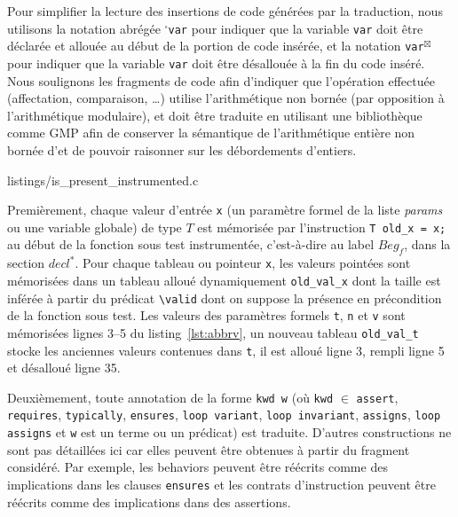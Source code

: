 Pour simplifier la lecture des insertions de code générées par la traduction,
nous utilisons la notation abrégée ${}^{\square}$\lstinline{var} pour indiquer
que la variable \lstinline{var} doit être déclarée et allouée 
au début de la portion de code insérée, et la notation
\lstinline{var}${}^{\boxtimes}$ pour indiquer que la variable \lstinline{var} doit
être désallouée
à la fin du code inséré.
Nous soulignons les fragments de code afin d'indiquer que l'opération effectuée
(affectation, comparaison, \dots) utilise l'arithmétique non bornée (par
opposition à l'arithmétique modulaire), et doit être traduite en utilisant une
bibliothèque comme GMP afin de conserver la sémantique de l'arithmétique entière
non bornée d'\eacsl et de pouvoir raisonner sur les débordements d'entiers.



                {listings/is_present_instrumented.c}


Premièrement, chaque valeur d'entrée \lstinline'x' (un paramètre formel de la
liste \textit{params} ou une variable globale) de type $T$ est mémorisée par
l'instruction \lstinline|T old_x = x;| au début de la fonction sous test
instrumentée, c'est-à-dire au label $Beg_f$, dans la section $decl^{*}$.
Pour chaque tableau ou pointeur \lstinline'x', les valeurs pointées sont
mémorisées dans un tableau alloué dynamiquement \lstinline'old_val_x' dont la
taille est inférée à partir du prédicat \lstinline'\valid' dont on suppose la
présence en précondition de la fonction sous test.
Les valeurs des paramètres formels \lstinline|t|, \lstinline|n| et \lstinline|v|
sont mémorisées lignes 3--5 du listing~\ref{lst:abbrv}, un nouveau tableau
\lstinline|old_val_t| stocke les anciennes valeurs contenues dans \lstinline|t|,
il est alloué ligne 3, rempli ligne 5 et désalloué ligne 35.

Deuxièmement, toute annotation \eacsl de la forme \lstinline'kwd w' (où
\lstinline'kwd' $\in$ \bopen \lstinline|assert|, \lstinline|requires|,
\lstinline|typically|, \lstinline|ensures|, \lstinline|loop variant|,
\lstinline|loop invariant|, \lstinline|assigns|, \lstinline|loop assigns|
\bclose et \lstinline'w' est un terme ou un prédicat) est traduite.
D'autres constructions \eacsl ne sont pas détaillées ici car elles peuvent être
obtenues à partir du fragment \eacsl considéré.
Par exemple, les behaviors peuvent être réécrits comme des implications dans les
clauses \lstinline'ensures' et les contrats d'instruction peuvent être réécrits
comme des implications dans des assertions.

